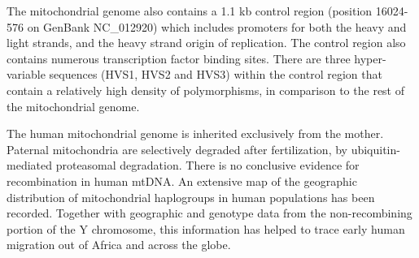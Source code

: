 \begin{table}[htbp]
\begin{minipage}{\textwidth}
\caption{Mitochondrial Protein Genes}
\label{intro.table.mito_proteins}
\noindent{}
\end{minipage}
\end{table}

The mitochondrial genome also contains a 1.1 kb control region (position 16024-576 on GenBank NC\_012920) which includes promoters for both the heavy and light strands, and the heavy strand origin of replication.  The control region also contains numerous transcription factor binding sites.  There are three hyper-variable sequences (HVS1, HVS2 and HVS3) within the control region that contain a relatively high density of polymorphisms, in comparison to the rest of the mitochondrial genome\cite{Stoneking2000}.

The human mitochondrial genome is inherited exclusively from the mother.  Paternal mitochondria are selectively degraded after fertilization, by ubiquitin-mediated proteasomal degradation\cite{sutovsky2003early,thompson2003ubiquitination}.  There is no conclusive evidence for recombination in human \ac{mtDNA}\cite{eyre2001does}.  An extensive map of the geographic distribution of mitochondrial haplogroups in human populations has been recorded.  Together with geographic and genotype data from the non-recombining portion of the Y chromosome, this information has helped to trace early human migration out of Africa and across the globe\cite{behar2007genographic}.

